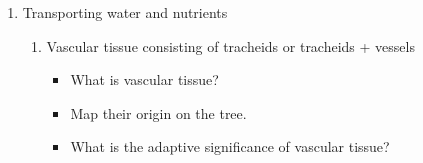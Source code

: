 \begin{frame}[t]
    \begin{adjustwidth}{-2em}{-1.5em}

        \begin{enumerate}
            \addtocounter{enumi}{1}
            \item Transporting water and nutrients
            \begin{enumerate}
                \item Vascular tissue consisting of tracheids or tracheids + vessels

                \begin{itemize}
                    \item What is vascular tissue?



                    \vspace{5mm}
                    \item Map their origin on the tree.


                    \vspace{5mm}
                    \item What is the adaptive significance of vascular tissue?


                \end{itemize}
            \end{enumerate}
        \end{enumerate}
    \end{adjustwidth}
\end{frame}

